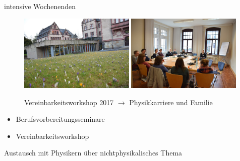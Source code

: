 \documentclass[
]{beamer}
\begin{document}
\begin{frame}{intensive Wochenenden}
  \begin{minipage}{0.6\textwidth}
    \begin{figure}
      \centering
      \includegraphics[width=0.49\textwidth]{figure/vereinbarkeitsworkshop_2017_PZ}\hfill
      \includegraphics[width=0.49\textwidth]{figure/vereinbarkeitsworkshop_2017_TN}\\
      \begin{center}
        Vereinbarkeitsworkshop 2017 $\rightarrow$ Physikkarriere und Familie
      \end{center}
     \end{figure}
  \end{minipage}
  \begin{minipage}{0.4\textwidth}
    \begin{itemize}
      \item Berufsvorbereitungsseminare
      \item Vereinbarkeitsworkshop
    \end{itemize}
    Austausch mit Physikern über nichtphysikalisches Thema
  \end{minipage}
\end{frame}
\end{document}
